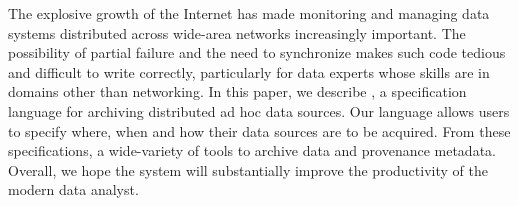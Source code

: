 The explosive growth of the Internet has made monitoring and managing
data systems distributed across wide-area networks increasingly
important.  The possibility of partial failure and the need to
synchronize makes such code tedious and difficult to write correctly,
particularly for data experts whose skills are in domains other than
networking. In this paper, we describe \padsd{}, a specification
language for archiving distributed ad hoc data sources.  Our language
allows users to specify where, when and how their data sources are
to be acquired.  From these specifications,
a wide-variety of tools to archive data and provenance metadata.  
Overall, we hope the system will substantially improve the productivity of
the modern data analyst.

